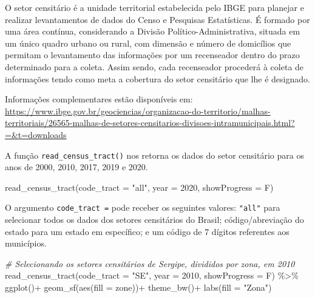 \documentclass[
  brazilian,
]{book}
\newenvironment{Shaded}{\begin{snugshade}}{\end{snugshade}}
\newcommand{\AttributeTok}[1]{\textcolor[rgb]{0.77,0.63,0.00}{#1}}
\newcommand{\CommentTok}[1]{\textcolor[rgb]{0.56,0.35,0.01}{\textit{#1}}}
\newcommand{\DecValTok}[1]{\textcolor[rgb]{0.00,0.00,0.81}{#1}}
\newcommand{\FunctionTok}[1]{\textcolor[rgb]{0.00,0.00,0.00}{#1}}
\newcommand{\NormalTok}[1]{#1}
\newcommand{\SpecialCharTok}[1]{\textcolor[rgb]{0.00,0.00,0.00}{#1}}
\newcommand{\StringTok}[1]{\textcolor[rgb]{0.31,0.60,0.02}{#1}}
\begin{document}
O setor censitário é a unidade territorial estabelecida pelo IBGE para planejar e realizar levantamentos de dados do Censo e Pesquisas Estatísticas. É formado por uma área contínua, considerando a Divisão Político-Administrativa, situada em um único quadro urbano ou rural, com dimensão e número de domicílios que permitam o levantamento das informações por um recenseador dentro do prazo determinado para a coleta. Assim sendo, cada recenseador procederá à coleta de informações tendo como meta a cobertura do setor censitário que lhe é designado.

Informações complementares estão disponíveis em: \url{https://www.ibge.gov.br/geociencias/organizacao-do-territorio/malhas-territoriais/26565-malhas-de-setores-censitarios-divisoes-intramunicipais.html?=\&t=downloads}

A função \texttt{read\_census\_tract()} nos retorna os dados do setor censitário para os anos de 2000, 2010, 2017, 2019 e 2020.

\begin{Shaded}
\begin{Highlighting}[]
\FunctionTok{read\_census\_tract}\NormalTok{(}\AttributeTok{code\_tract =} \StringTok{"all"}\NormalTok{,}
                  \AttributeTok{year =} \DecValTok{2020}\NormalTok{,}
                  \AttributeTok{showProgress =}\NormalTok{ F)}
\end{Highlighting}
\end{Shaded}

O argumento \texttt{code\_tract\ =} pode receber os seguintes valores: \texttt{"all"} para selecionar todos os dados dos setores censitários do Brasil; código/abreviação do estado para um estado em específico; e um código de 7 dígitos referentes aos municípios.

\begin{Shaded}
\begin{Highlighting}[]
\CommentTok{\# Selecionando os setores censitários de Sergipe, divididos por zona, em 2010}
\FunctionTok{read\_census\_tract}\NormalTok{(}\AttributeTok{code\_tract =} \StringTok{"SE"}\NormalTok{,}
                  \AttributeTok{year =} \DecValTok{2010}\NormalTok{,}
                  \AttributeTok{showProgress =}\NormalTok{ F) }\SpecialCharTok{\%\textgreater{}\%} 
  \FunctionTok{ggplot}\NormalTok{()}\SpecialCharTok{+}
  \FunctionTok{geom\_sf}\NormalTok{(}\FunctionTok{aes}\NormalTok{(}\AttributeTok{fill =}\NormalTok{ zone))}\SpecialCharTok{+}
  \FunctionTok{theme\_bw}\NormalTok{()}\SpecialCharTok{+}
  \FunctionTok{labs}\NormalTok{(}\AttributeTok{fill =} \StringTok{"Zona"}\NormalTok{)}
\end{Highlighting}
\end{Shaded}
\end{document}
